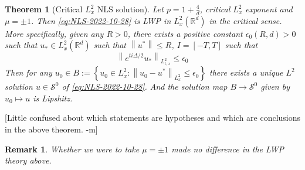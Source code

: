 \documentclass{article}
\def\purple{\color{Purple}}
\newcommand{\pnote}[1]{{\purple [#1]}} %
\newtheorem{theorem}{Theorem}
\newtheorem{remark}{Remark}
\def\R{\mathbb{R}} %
\newcommand\norm[1]{\left\lVert#1\right\rVert}
\begin{document}
\begin{theorem}[Critical $L_x^2$ NLS solution]
  \label{thm:critical-Lx2-NLS-solution}
  Let $p=1+\frac{4}{d}$, critical $L_{x}^{2}$ exponent and $\mu=\pm 1$. Then
  \cref{eq:NLS-2022-10-28} is LWP in $L_{x}^{2}(\R^d)$ in the critical sense.
  More specifically, given any $R>0$,  there exists a positive constant
  $\epsilon_{0}(R,d)>0$ such that $u_{*}\in L^{2}_{x}(\R^d)$ such that
  $\norm{u^{*}} \leq R$, $I=[-T,T]$  such that
  \begin{equation*}
    \norm{e^{ti\Delta/2}u_{*}}_{L_{t,x}^{2}} 
    \leq \epsilon_{0}
  \end{equation*}
  Then for any
  $u_{0}\in B:= \left\{ u_{0}\in L_{x}^{2}: \norm{u_{0}-u^{*}}_{L_{x}^{2}}\leq
    \epsilon_{0}\right\} $ there exists a unique $L^{2}$ solution
  $u\in \mathcal{S}^{0}$ of \cref{eq:NLS-2022-10-28}. And the solution map
  $B\to \mathcal{S}^{0}$ given by $u_{0}\mapsto u$ is Lipshitz.
\end{theorem} \pnote{Little confused about which statements are hypotheses and
  which are conclusions in the above theorem. -m}
\begin{remark}
  Whether we were to take $\mu=\pm 1$ made no difference in the LWP theory
  above.
\end{remark}
\end{document}
